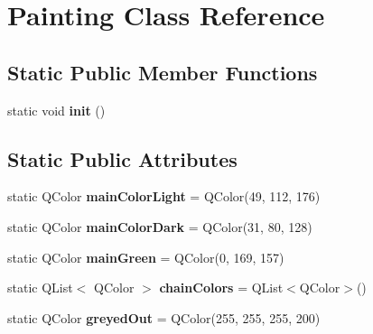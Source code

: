 \hypertarget{class_painting}{\section{Painting Class Reference}
\label{class_painting}
}
\subsection*{Static Public Member Functions}
\begin{DoxyCompactItemize}
\item 
\hypertarget{class_painting_a2aabaf2990a1d25df61669aa99dbdae4}{static void {\bfseries init} ()}\label{class_painting_a2aabaf2990a1d25df61669aa99dbdae4}

\end{DoxyCompactItemize}
\subsection*{Static Public Attributes}
\begin{DoxyCompactItemize}
\item 
\hypertarget{class_painting_a8257219f7d7685cf67468af1acebc7a0}{static Q\-Color {\bfseries main\-Color\-Light} = Q\-Color(49, 112, 176)}\label{class_painting_a8257219f7d7685cf67468af1acebc7a0}

\item 
\hypertarget{class_painting_abc76bbaca8c790edfe713e00767834f5}{static Q\-Color {\bfseries main\-Color\-Dark} = Q\-Color(31, 80, 128)}\label{class_painting_abc76bbaca8c790edfe713e00767834f5}

\item 
\hypertarget{class_painting_adccbae9b4b7cd221430396772e1751bd}{static Q\-Color {\bfseries main\-Green} = Q\-Color(0, 169, 157)}\label{class_painting_adccbae9b4b7cd221430396772e1751bd}

\item 
\hypertarget{class_painting_a21eabab4e88a660dd93dc9e038b499ad}{static Q\-List$<$ Q\-Color $>$ {\bfseries chain\-Colors} = Q\-List$<$Q\-Color$>$()}\label{class_painting_a21eabab4e88a660dd93dc9e038b499ad}

\item 
\hypertarget{class_painting_ab644c6710b0d0aa226679a346c4d6b5e}{static Q\-Color {\bfseries greyed\-Out} = Q\-Color(255, 255, 255, 200)}\label{class_painting_ab644c6710b0d0aa226679a346c4d6b5e}

\end{DoxyCompactItemize}


